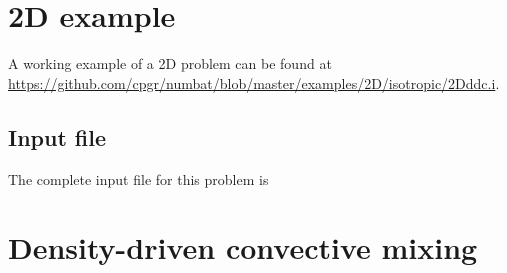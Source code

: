 \section{2D example}\label{d-example}

A working example of a 2D problem can be found at
\url{https://github.com/cpgr/numbat/blob/master/examples/2D/isotropic/2Dddc.i}.

\subsection{Input file}\label{input-file}

The complete input file for this problem is

\section{Density-driven convective
mixing}\label{density-driven-convective-mixing}

